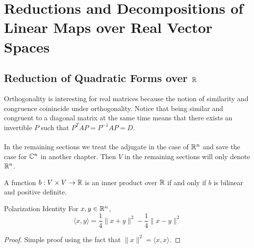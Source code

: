 \documentclass[a4paper]{article}
\begin{document}
\pagebreak
\section{Reductions and Decompositions of Linear Maps over Real Vector Spaces}
\subsection{Reduction of Quadratic Forms over $\mathbb{R}$}
Orthogonality is interesting for real matrices because the notion of similarity and congruence coinincide under orthogonality. Notice that being similar and congruent to a diagonal matrix at the same time means that there exists an invertible $P$ such that $P^TAP=P^{-1}AP=D$. \\~\\

In the remaining sections we treat the adjugate in the case of $\mathbb{R}^n$ and save the case for $\mathbb{C}^n$ in another chapter. Then $V$ in the remaining sections will only denote $\mathbb{R}^n$. 

\begin{prp}{}{} A function $b:V\times V\to\mathbb{R}$ is an inner product over $\mathbb{R}$ if and only if $b$ is bilinear and positive definite. 
\end{prp}

\begin{lmm}{Polarization Identity}{} For $x,y\in\mathbb{R}^n$, $$\langle x,y\rangle=\frac{1}{4}\|x+y\|^2-\frac{1}{4}\|x-y\|^2$$\tcbline
\begin{proof} Simple proof using the fact that $\|x\|^2=\langle x,x\rangle$. 
\end{proof}
\end{lmm}
\end{document}
